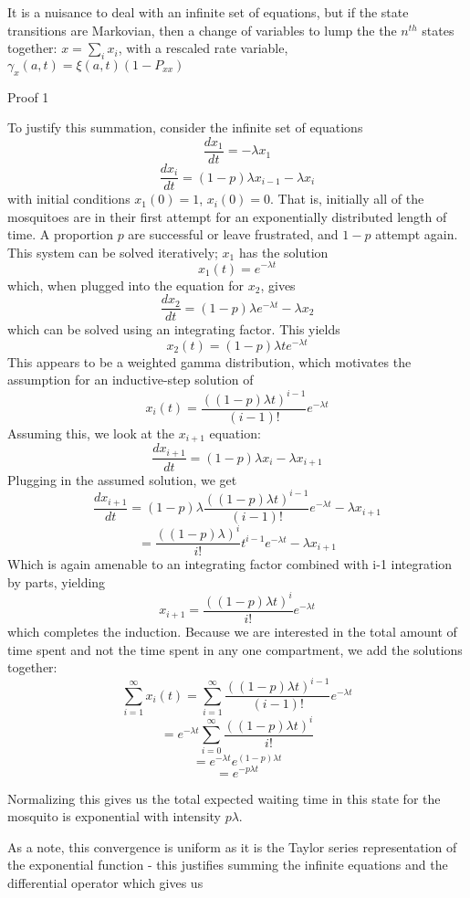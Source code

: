 \documentclass{article}
\begin{document}
It is a nuisance to deal with an infinite set of equations, but
if the state transitions are Markovian, then a change of
variables to lump the the $n^{th}$ states together: $x = \sum_i
x_i$, with a rescaled rate variable, $\gamma_x(a,t) =
\xi(a,t) (1-P_{xx})$   

\begin{bf}
Proof 1
\end{bf}

To justify this summation, consider the infinite set of equations
$$\frac{d x_1}{dt} = -\lambda x_1$$
$$\frac{d x_i}{dt} = (1-p) \lambda x_{i-1} - \lambda x_i$$
with initial conditions $x_1(0) = 1$, $x_i(0) = 0$. That is, initially
all of the mosquitoes are in their first attempt for an exponentially
distributed length of time. A proportion $p$ are successful or leave frustrated,
and $1-p$ attempt again. This system can be solved iteratively; $x_1$ has the solution
$$x_1(t) = e^{-\lambda t}$$ 
which, when plugged into the equation for $x_2$, gives
$$\frac{d x_2}{dt} = (1-p) \lambda e^{-\lambda t} - \lambda x_2$$ 
which can be solved using an integrating factor. This yields
$$x_2(t) = (1-p) \lambda t e^{-\lambda t}$$
This appears to be a weighted gamma distribution, which motivates the
assumption for an inductive-step solution of
$$x_i(t) = \frac{((1-p) \lambda t)^{i-1}}{(i-1)!} e^{-\lambda t}$$
Assuming this, we look at the $x_{i+1}$ equation:
$$\frac{d x_{i+1}}{dt} = (1-p)\lambda x_i - \lambda x_{i+1}$$
Plugging in the assumed solution, we get
$$\frac{d x_{i+1}}{dt} = (1-p)\lambda \frac{((1-p) \lambda t)^{i-1}}{(i-1)!} e^{-\lambda t} - \lambda x_{i+1}$$
$$= \frac{((1-p) \lambda)^i}{i!}t^{i-1} e^{-\lambda t} - \lambda x_{i+1}$$
Which is again amenable to an integrating factor combined with i-1 integration by parts,
yielding
$$x_{i+1} = \frac{((1-p) \lambda t)^{i}}{i!} e^{-\lambda t}$$
which completes the induction.
Because we are interested in the total amount of time spent and not the time
spent in any one compartment, we add the solutions together:
$$\sum_{i = 1}^{\infty} x_i(t) = \sum_{i = 1}^{\infty}\frac{((1-p) \lambda t)^{i-1}}{(i-1)!} e^{-\lambda t}$$
$$ = e^{-\lambda t} \sum_{i=0}^{\infty}\frac{((1-p) \lambda t)^i}{i!}$$
$$ = e^{-\lambda t} e^{(1-p)\lambda t}$$
$$ = e^{-p \lambda t}$$

Normalizing this gives us the total expected waiting time in this state for the
mosquito is exponential with intensity $p \lambda$.

As a note, this convergence is uniform as it is the Taylor series representation
of the exponential function - this justifies summing the infinite equations and
the differential operator which gives us
\end{document}
